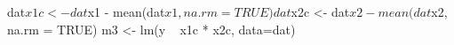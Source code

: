 \begin{Schunk}
\begin{Sinput}
 dat$x1c <- dat$x1 - mean(dat$x1, na.rm = TRUE)
 dat$x2c <- dat$x2 - mean(dat$x2, na.rm = TRUE)
 m3 <- lm(y ~ x1c * x2c, data=dat)
\end{Sinput}
\end{Schunk}

